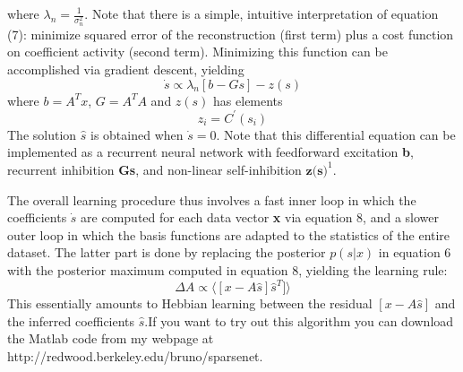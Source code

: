 \documentclass{article}
\begin{document}
where $\lambda_n = \frac{1}{\sigma_n^2}$. Note that there is a simple, intuitive interpretation of equation (7): minimize squared error of the reconstruction (first term) plus a cost function on coefficient activity (second term). Minimizing this function can be accomplished via gradient descent, yielding
\begin{equation}
    \dot{s} \propto \lambda_{n}[b - Gs] - z(s)
\end{equation}
where $b = A^{T}x$, $G = A^{T}A$ and $z(s)$ has elements
\begin{equation}
    z_i = C^{'}(s_i)
\end{equation}
The solution $\hat{s}$ is obtained when $\dot{s} = 0$. Note that this differential equation can be implemented as a recurrent neural network with feedforward excitation \textbf{b}, recurrent inhibition \textbf{Gs}, and non-linear self-inhibition $\textbf{z(s)}^1$.
\par
The overall learning procedure thus involves a fast inner loop in which the coefficients $\dot{s}$ are computed for each data vector \textbf{x} via equation 8, and a slower outer loop in which the basis functions are adapted to the statistics of the entire dataset. The latter part is done by replacing the posterior $p(s|x)$ in equation 6 with the posterior maximum computed in equation 8, yielding the learning rule:
\begin{equation}
    \Delta{A} \propto \langle[x - A\hat{s}]\hat{s}^T]\rangle
\end{equation}
This essentially amounts to Hebbian learning between the residual $[x - A\hat{s}]$ and the inferred coefficients $\hat{s}$.If you want to try out this algorithm you can download the Matlab code from my webpage at http://redwood.berkeley.edu/bruno/sparsenet.
\end{document}
